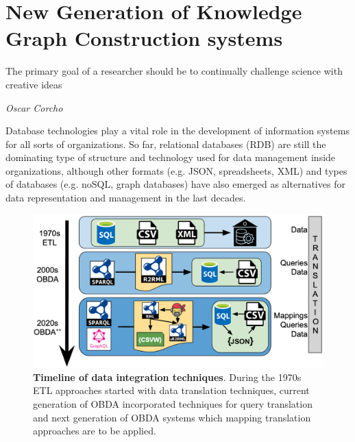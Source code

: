 
\chapter{New Generation of Knowledge Graph Construction systems}
\label{chapter:mappig-translation}

\epigraph{The primary goal of a researcher should be to continually challenge science with creative ideas}{\textit{Oscar Corcho}}


Database technologies play a vital role in the development of information systems for all sorts of organizations. So far, relational databases (RDB) are still the dominating type of structure and technology used for data management inside organizations, although other formats (e.g. JSON, spreadsheets, XML) and types of databases (e.g. noSQL, graph databases) have also emerged as alternatives for data representation and management in the last decades. 

\begin{figure}[!ht]
    \centering
    \includegraphics[width=1\columnwidth]{./figures/mt_obda_timeline.png}
    \caption[Timeline of data integration techniques]{\textbf{Timeline of data integration techniques}. During the 1970s ETL approaches started with data translation techniques, current generation of OBDA incorporated techniques for query translation and next generation of OBDA systems which mapping translation approaches are to be applied.%
    }
    \label{fig:obdatimeline}
\end{figure}

